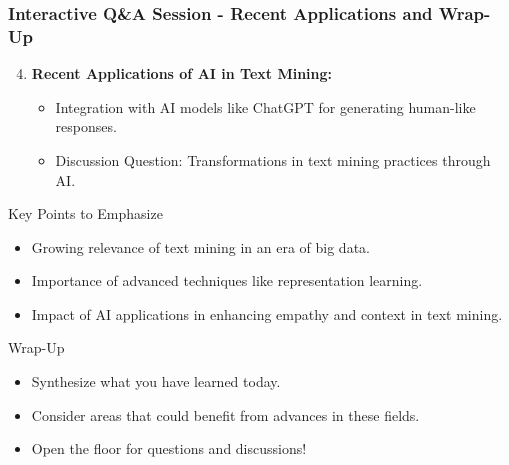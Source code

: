 \documentclass[aspectratio=169]{beamer}
\begin{document}
\begin{frame}[fragile]
    \frametitle{Interactive Q\&A Session - Recent Applications and Wrap-Up}
    \begin{enumerate}
        \setcounter{enumi}{3}
        \item \textbf{Recent Applications of AI in Text Mining:}
            \begin{itemize}
                \item Integration with AI models like ChatGPT for generating human-like responses.
                \item Discussion Question: Transformations in text mining practices through AI.
            \end{itemize}
    \end{enumerate}
    
    \begin{block}{Key Points to Emphasize}
        \begin{itemize}
            \item Growing relevance of text mining in an era of big data.
            \item Importance of advanced techniques like representation learning.
            \item Impact of AI applications in enhancing empathy and context in text mining.
        \end{itemize}
    \end{block}
    
    \begin{block}{Wrap-Up}
        \begin{itemize}
            \item Synthesize what you have learned today.
            \item Consider areas that could benefit from advances in these fields.
            \item Open the floor for questions and discussions!
        \end{itemize}
    \end{block}
\end{frame}
\end{document}
